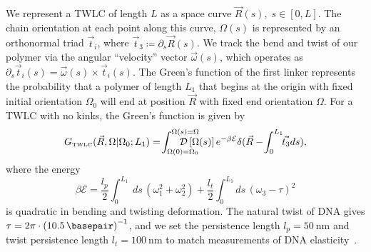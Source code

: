 \documentclass[%
 reprint,
superscriptaddress,
showpacs,preprintnumbers,
 amsmath,amssymb,
 aps,
 prl,
]{revtex4-1}
\newcommand{\gwlc}[2][\Omega_0; L_0]{G_\text{\tiny TWLC}(#2|#1)}
\newcommand{\pathd}[1]{\mathcal{D}\left[#1\right]}
\newcommand{\energy}{\mathcal{E}}
\begin{document}
We represent a TWLC of length $L$ as a space curve $\vec{R}(s),\;s\in[0,L]$.
The chain orientation at each point along this curve, $\Omega(s)$ is represented
    by an orthonormal triad $\vec{t}_{i}$, where $\vec{t}_{3} \coloneqq
    \partial_s \vec{R}(s)$.
We track the bend and twist of our polymer via the angular ``velocity'' vector
    $\vec{\omega}(s)$, which operates as $\partial_s \vec{t}_{i}(s) =
    \vec{\omega}(s) \times \vec{t}_{i}(s)$.
The Green's function of the first linker represents the probability that a
    polymer of length $L_1$ that begins at the origin with fixed initial
    orientation $\Omega_0$ will end at position $\vec{R}$ with fixed end
    orientation $\Omega$.
For a TWLC with no kinks, the Green's function is given by
    \begin{equation}\label{eq:path}
        \gwlc[\Omega_0;L_1]{\vec{R}, \Omega} =\! \int_{\Omega(0)=\Omega_0}^{\Omega(s)=\Omega}
        \hspace{-0.3in}
        \pathd{\Omega(s)}
                e^{-\beta \mathcal{E}}\delta(\vec{R} - \!\int_{0}^{L_1} \!\!\vec{t_3} ds),
    \end{equation}
    where the energy
    \begin{equation}\label{eq:energy}
        \beta\energy = \frac{l_p}{2}\int_{0}^{L_1} \!\ \! ds \,
        (\omega_1^2 + \omega_2 ^2) + \frac{l_t}{2}\int_{0}^{L_1} \! \! ds \,
        {\left(\omega_3 - \tau\right)}^2
    \end{equation}
    is quadratic in bending and twisting deformation.
The natural twist of DNA gives $\tau = 2 \pi \cdot {(\SI{10.5}{\basepair})}^{-1}$,
    and we set the persistence length $l_p = \SI{50}{\nano\metre}$ and twist
    persistence length {$l_t = \SI{100}{\nano\metre}$} to match
    measurements of DNA elasticity~\cite{hagerman1988,bustamante1994,bryant2003}.
\end{document}
